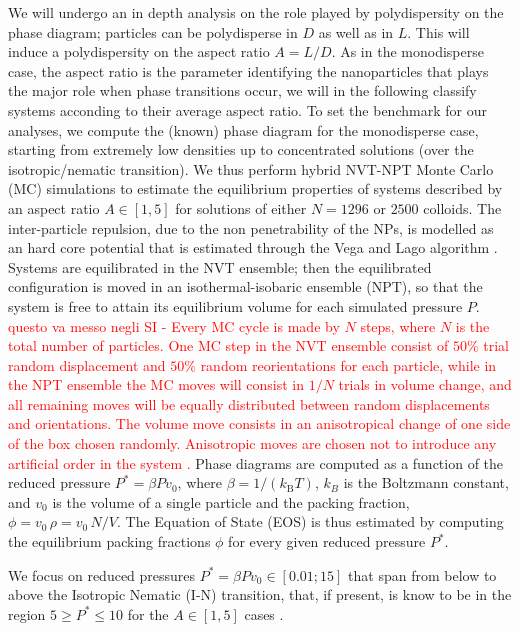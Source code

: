 \documentclass[journal=jacsat,manuscript=article]{achemso}
\begin{document}
We will undergo an in depth analysis on the role played by  polydispersity  on the phase diagram; particles can be polydisperse in  $D$ as well as in $L$. This will induce a polydispersity on the aspect ratio  $A = L/D$. As in the monodisperse case, the aspect ratio is the parameter identifying the nanoparticles that plays the major role when phase transitions occur,  we will in the following classify systems acconding to their average aspect ratio. To set the benchmark for our analyses, we compute the (known) phase diagram for the monodisperse case, starting from extremely low densities  up to concentrated solutions (over the isotropic/nematic transition). We thus perform hybrid NVT-NPT Monte Carlo (MC) simulations to estimate the equilibrium properties of systems described by an aspect ratio $A \in [1, 5]$ for solutions of either $N = 1296$ or $2500$ colloids.  
The inter-particle repulsion, due to the non penetrability of the NPs,  is modelled as an hard core potential that is estimated through the Vega and Lago algorithm \cite{VegaHSC1994}. 
 Systems are equilibrated in the NVT ensemble; then the equilibrated  configuration is moved in an isothermal-isobaric ensemble  (NPT), so that the system is free to attain its equilibrium volume for each simulated pressure $P$. 
 \textcolor{red}{ questo va messo negli SI - 
 Every MC cycle is made by $N$ steps, where $N$ is the total number of particles. One MC step in the NVT ensemble consist of $50\%$ trial random displacement  and $50\%$ random reorientations for each  particle, while in the NPT ensemble the MC moves will consist in  $1/N$ trials in volume change, and all remaining moves will be equally distributed between random displacements and orientations. 
	The volume move consists in an anisotropical change of  one  side of the box chosen randomly. Anisotropic moves are chosen not to introduce any artificial order in the system \cite{frenkel.md.book.1996}. 
	}
Phase diagrams are computed as a function of the  reduced pressure  $P^* = \beta P v_0$, where $\beta = 1/(k_\mathrm{B} T)$, $k_B$ is the Boltzmann constant, and $v_0$ is the volume of a single particle and the packing fraction, $\phi = v_0 \, \rho = v_0 \, N / V$. 
The Equation of State (EOS) is thus  estimated  by computing the equilibrium  packing fractions $\phi$ for every given reduced pressure $P^* $. 

We focus on reduced pressures  $P^* = \beta P v_0 \in [0.01; 15]$ that span from below to above the Isotropic Nematic (I-N) transition, that, if present, is know to be in the region  $5 \geq P^* \leq 10$ for the $A\in[1,5]$ cases \cite{Bolhuis1997, Jackson1996}. 
\end{document}
